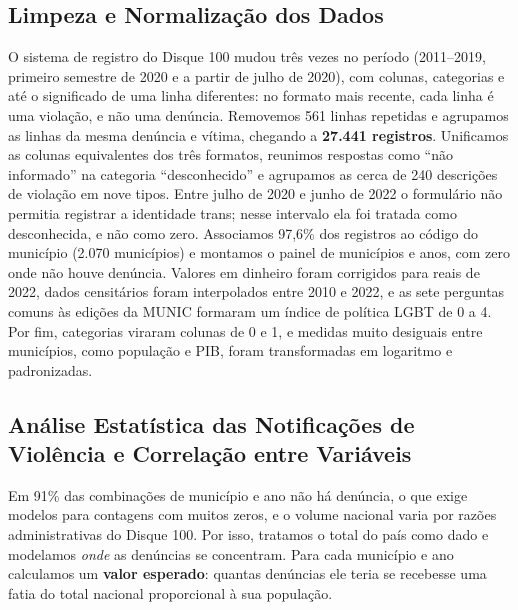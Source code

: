 \documentclass[12pt]{article}
\begin{document}
\subsection{Limpeza e Normalização dos Dados}

O sistema de registro do Disque 100 mudou três vezes no período (2011--2019, primeiro semestre de 2020 e a partir de julho de 2020), com colunas, categorias e até o significado de uma linha diferentes: no formato mais recente, cada linha é uma violação, e não uma denúncia. Removemos 561 linhas repetidas e agrupamos as linhas da mesma denúncia e vítima, chegando a \textbf{27.441 registros}. Unificamos as colunas equivalentes dos três formatos, reunimos respostas como ``não informado'' na categoria ``desconhecido'' e agrupamos as cerca de 240 descrições de violação em nove tipos. Entre julho de 2020 e junho de 2022 o formulário não permitia registrar a identidade trans; nesse intervalo ela foi tratada como desconhecida, e não como zero. Associamos 97,6\% dos registros ao código do município (2.070 municípios) e montamos o painel de municípios e anos, com zero onde não houve denúncia. Valores em dinheiro foram corrigidos para reais de 2022, dados censitários foram interpolados entre 2010 e 2022, e as sete perguntas comuns às edições da MUNIC formaram um índice de política LGBT de 0 a 4. Por fim, categorias viraram colunas de 0 e 1, e medidas muito desiguais entre municípios, como população e PIB, foram transformadas em logaritmo e padronizadas.

\subsection{Análise Estatística das Notificações de Violência e Correlação entre Variáveis}

Em 91\% das combinações de município e ano não há denúncia, o que exige modelos para contagens com muitos zeros, e o volume nacional varia por razões administrativas do Disque 100. Por isso, tratamos o total do país como dado e modelamos \textit{onde} as denúncias se concentram. Para cada município e ano calculamos um \textbf{valor esperado}: quantas denúncias ele teria se recebesse uma fatia do total nacional proporcional à sua população.
\end{document}
